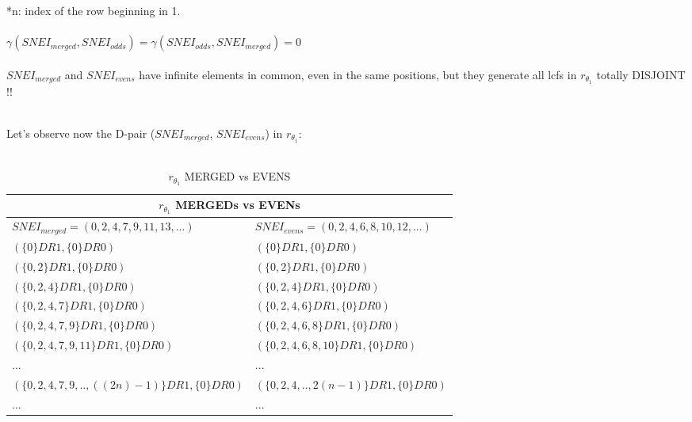 	\noindent
	*n: index of the row beginning in 1.
	\\\\
	
	\noindent
	$\gamma(SNEI_{merged}, SNEI_{odds}) = \gamma(SNEI_{odds}, SNEI_{merged}) = 0 $
	\\\\
	
	\noindent
	$SNEI_{merged}$ and $SNEI_{evens}$ have infinite elements in common, even in the same positions, but they generate all lcfs in $r_{\theta_{1}}$ totally DISJOINT !!
	\\\\
	
	\newpage
	
	\noindent
	Let's observe now the D-pair ($SNEI_{merged}$, $SNEI_{evens}$) in $r_{\theta_{1}}$:
	\\\\
	
	\begin{table}[h!]
		\begin{center}
			\begin{tabular}{|l||l|}
				\hline
				\multicolumn{2}{|c|}{\cellcolor{lightgray} {$r_{\theta_{1}}$ MERGEDs vs EVENs } } \\
				\hline
				$SNEI_{merged} = (0,2,4,7,9,11,13,...)$ & $ SNEI_{evens} = (0,2,4,6,8,10,12,...)$   \\
				\hline
				\hline
				\cellcolor{bosunired!50}  $ ( \{0\}DR1, \{0\}DR0 ) $        & \cellcolor{bosunired!50}  $ ( \{0\}DR1, \{0\}DR0 ) $ \\
				\hline
				\cellcolor{bosunired!50}  $ ( \{0,2\}DR1, \{0\}DR0 ) $      & \cellcolor{bosunired!50}  $ ( \{0,2\}DR1, \{0\}DR0 ) $ \\
				\hline
				\cellcolor{bosunired!50}  $ ( \{0,2,4\}DR1, \{0\}DR0 ) $    & \cellcolor{bosunired!50}  $ ( \{0,2,4\}DR1, \{0\}DR0 ) $ \\
				\hline
				\cellcolor{applegreen!50} $ ( \{0,2,4,7\}DR1, \{0\}DR0 ) $  & \cellcolor{applegreen!50} $ ( \{0,2,4,6\}DR1, \{0\}DR0 ) $ \\
				\hline
				$ ( \{0,2,4,7,9\}DR1, \{0\}DR0 ) $ & $ ( \{0,2,4,6,8\}DR1, \{0\}DR0 ) $ \\
				\hline
				$ ( \{0,2,4,7,9,11\}DR1, \{0\}DR0 ) $ & $ ( \{0,2,4,6,8,10\}DR1, \{0\}DR0 ) $ \\
				\hline
				... & ... \\
				\hline
				$ (\{0,2,4,7,9,.., ((2n)-1)\}DR1, \{0\}DR0 )$ & $ (\{0,2,4,.., 2(n-1) \}DR1, \{0\}DR0 )$ \\
				\hline
				... & ... \\
				\hline
				
			\end{tabular}
			\caption{$r_{\theta_{1}}$  MERGED vs EVENS}
			\label{tab: r_theta_1_merged_vs_evens}
		\end{center}
	\end{table}

